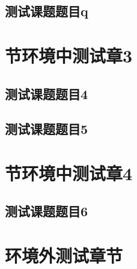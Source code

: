 \documentclass[color=yellow,openany]{textbook-cn}%
\begin{document}
\begin{Project}

\makeatletter

\section{测试课题题目q}


\chapter{节环境中测试章3}


\section{测试课题题目4}

\begin{Definition}[定义名称]
\lipsum[1]
\end{Definition}


\section{测试课题题目5}

\begin{Definition}[定义名称]
\lipsum[1]
\end{Definition}


\chapter{节环境中测试章4}


\section{测试课题题目6}

\begin{Definition}[定义名称]
\lipsum[1]
\end{Definition}

\makeatother

\end{Project}





\chapter{环境外测试章节}
\end{document}
